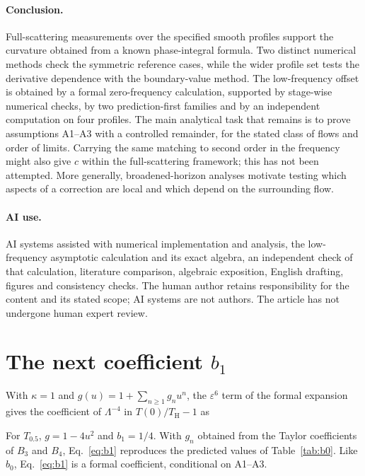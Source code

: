 \documentclass[10pt,a4paper]{article}
\newcommand{\HawkingT}{T_{\mathrm H}}
\begin{document}
\paragraph{Conclusion.}
Full-scattering measurements over the specified smooth profiles support
the curvature obtained from a known phase-integral formula. Two distinct
numerical methods check the symmetric reference cases, while the wider
profile set tests the derivative dependence with the boundary-value
method. The low-frequency offset is obtained by a formal zero-frequency
calculation, supported by stage-wise numerical checks, by two
prediction-first families and by an independent computation on four
profiles. The main analytical task that remains is to
prove assumptions A1--A3 with a controlled remainder, for the stated class
of flows and order of limits. Carrying the same matching to second order in
the frequency might also give $c$ within the full-scattering framework; this
has not been attempted.
More generally, broadened-horizon analyses \cite{FP,CP} motivate testing
which aspects of a correction are local and which depend on the
surrounding flow.

\paragraph{AI use.}
AI systems assisted with numerical implementation and analysis,
the low-frequency asymptotic calculation and its exact algebra, an
independent check of that calculation, literature comparison, algebraic exposition, English drafting, figures
and consistency checks. The human author retains responsibility for
the content and its stated scope; AI systems are not authors. The
article has not undergone human expert review.

\appendix
\section{The next coefficient \texorpdfstring{$b_1$}{b1}}
\label{app:b1}
With $\kappa=1$ and $g(u)=1+\sum_{n\geq1}g_nu^n$, the $\varepsilon^6$ term
of the formal expansion gives the coefficient of $\Lambda^{-4}$ in
$T(0)/\HawkingT-1$ as

For $T_{0.5}$, $g=1-4u^2$ and $b_1=1/4$. With $g_n$ obtained from the Taylor
coefficients of $B_3$ and $B_4$, Eq.~\eqref{eq:b1} reproduces the predicted
values of Table~\ref{tab:b0}. Like $b_0$, Eq.~\eqref{eq:b1} is a formal
coefficient, conditional on A1--A3.
\end{document}
